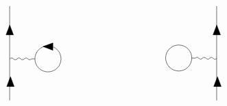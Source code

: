 \begin{equation}
\begin{tikzpicture}[x=0.75pt,y=0.75pt,yscale=-1,xscale=1]
\draw    (172,46.6) -- (172,178) ;
\draw  [fill={rgb, 255:red, 0; green, 0; blue, 0 }  ,fill opacity=1 ] (172.13,73) -- (177.25,86.6) -- (167,86.6) -- cycle ;
\draw  [fill={rgb, 255:red, 0; green, 0; blue, 0 }  ,fill opacity=1 ] (173.13,145) -- (178.25,158.6) -- (168,158.6) -- cycle ;
\draw   (207,120.13) .. controls (207,110.11) and (215.11,102) .. (225.13,102) .. controls (235.14,102) and (243.25,110.11) .. (243.25,120.13) .. controls (243.25,130.14) and (235.14,138.25) .. (225.13,138.25) .. controls (215.11,138.25) and (207,130.14) .. (207,120.13) -- cycle ;
\draw    (172.25,120.13) .. controls (173.92,118.46) and (175.58,118.46) .. (177.25,120.13) .. controls (178.92,121.8) and (180.58,121.8) .. (182.25,120.13) .. controls (183.92,118.46) and (185.58,118.46) .. (187.25,120.13) .. controls (188.92,121.8) and (190.58,121.8) .. (192.25,120.13) .. controls (193.92,118.46) and (195.58,118.46) .. (197.25,120.13) .. controls (198.92,121.8) and (200.58,121.8) .. (202.25,120.13) -- (207,120.13) -- (207,120.13) ;
\draw  [fill={rgb, 255:red, 0; green, 0; blue, 0 }  ,fill opacity=1 ] (218.33,102.93) -- (231.98,97.95) -- (231.87,108.19) -- cycle ;
\draw    (459,46.6) -- (459,178) ;
\draw  [fill={rgb, 255:red, 0; green, 0; blue, 0 }  ,fill opacity=1 ] (459.13,73) -- (464.25,86.6) -- (454,86.6) -- cycle ;
\draw  [fill={rgb, 255:red, 0; green, 0; blue, 0 }  ,fill opacity=1 ] (460.13,145) -- (465.25,158.6) -- (455,158.6) -- cycle ;
\draw   (424.52,119.08) .. controls (424.42,129.09) and (416.22,137.12) .. (406.21,137.01) .. controls (396.2,136.91) and (388.17,128.71) .. (388.27,118.7) .. controls (388.38,108.69) and (396.58,100.66) .. (406.59,100.76) .. controls (416.6,100.87) and (424.63,109.07) .. (424.52,119.08) -- cycle ;
\draw    (459.27,119.44) .. controls (457.58,121.09) and (455.92,121.08) .. (454.27,119.39) .. controls (452.62,117.71) and (450.95,117.69) .. (449.27,119.34) .. controls (447.59,120.99) and (445.92,120.97) .. (444.27,119.29) .. controls (442.62,117.6) and (440.96,117.58) .. (439.27,119.23) .. controls (437.59,120.88) and (435.92,120.86) .. (434.27,119.18) .. controls (432.62,117.5) and (430.95,117.48) .. (429.27,119.13) -- (424.52,119.08) -- (424.52,119.08) ;

\end{tikzpicture}
\end{equation}

